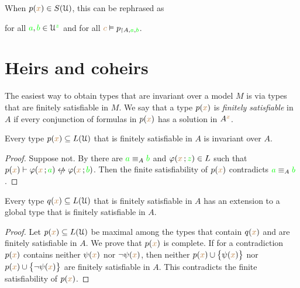 When $p({\color{brown} x})\in S(\EuScript U)$, this can be rephrased as

\hfill for all ${\color{green} a},{\color{green} b}\in\EuScript U^{\color{green} z}$ and for all ${\color{brown} c}\vDash p_{\restriction A,{\color{green} a},{\color{green} b}}$.

\section{Heirs and coheirs}
\label{coheirs}

\def\medrel#1{\parbox[t]{6ex}{$\displaystyle\hfil #1$}}
\def\ceq#1#2#3{\parbox[t]{16ex}{$\displaystyle #1$}\medrel{#2}{$\displaystyle #3$}}

The easiest way to obtain types that are invariant over a model $M$ is via types that are finitely satisfiable in $M$.
We say that a type $p({\color{brown} x})$ is \emph{finitely satisfiable\/} in $A$ if every conjunction of formulas in $p({\color{brown} x})$ has a solution in $A^{\color{brown} x}$.

\begin{proposition}\label{prop_coeredi_quasiinvarienti}
  Every type $p({\color{brown} x})\subseteq L(\EuScript U)$ that is finitely satisfiable in $A$ is invariant over $A$.
\end{proposition}

\begin{proof}
  Suppose not.
  By  there are ${\color{green} a}\equiv_A{\color{green} b}$ and $\varphi({\color{brown} x}\,;{\color{green} z})\in L$ such that $p({\mr x})\proves\phi({\mr x}\,;{\gr a})\niff\phi({\mr x}\,;{\gr b})$.
  Then the finite satisfiability of $p({\color{brown} x})$ contradicts ${\color{green} a}\equiv_A{\color{green} b}$.
\end{proof}

\begin{proposition}\label{prop_exisntence_coheirs}
  Every type $q({\color{brown} x})\subseteq L(\EuScript U)$ that is finitely satisfiable in $A$ has an extension to a global type that is finitely satisfiable in $A$.
\end{proposition}

\begin{proof}
  Let $p({\color{brown} x})\subseteq L(\EuScript U)$ be maximal among the types that contain $q({\color{brown} x})$ and are finitely satisfiable in $A$.
  We prove that $p({\color{brown} x})$ is complete.
  If for a contradiction $p({\color{brown} x})$ contains neither $\psi({\color{brown} x})$ nor $\neg\psi({\color{brown} x})$, then  neither $p({\color{brown} x})\cup\big\{\psi({\color{brown} x})\big\}$ nor $p({\color{brown} x})\cup\big\{\neg\psi({\color{brown} x})\big\}$ are finitely satisfiable in $A$.
  This contradicts the finite satisfiability of $p({\color{brown} x})$.
\end{proof}

